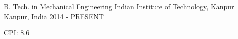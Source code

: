 

\begin{cventries}

  \cventry
    {B. Tech. in Mechanical Engineering} %
    {Indian Institute of Technology, Kanpur} %
    {Kanpur, India} %
    {2014 - PRESENT} %
    {
        \begin{cvitems}
            \item{CPI: 8.6}
        \end{cvitems}
    }




\end{cventries}

